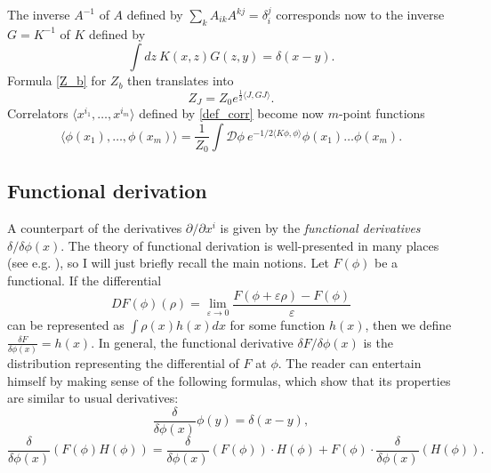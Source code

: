\documentclass[10pt]{amsart}
\theoremstyle{definition}
\theoremstyle{remark}
\newcommand{\dd}{\partial}
\def\<{\langle}
\def\>{\rangle}
\newcommand{\cD}{\mathcal{D}}
\newcommand{\Gd}{\delta}
\newcommand{\Ge}{\varepsilon}
\begin{document}
The inverse $A^{-1}$ of $A$ defined by
   $\sum_k A_{ik}A^{kj}= \Gd_i^j$
corresponds now to the inverse $G=K^{-1}$ of $K$ defined by
$$
        \int dz\ K(x,z)G(z,y)=\Gd(x-y).
$$
Formula \eqref{Z_b} for $Z_b$ then translates into
$$
         Z_J=Z_0 e^{\frac12\<J,G J\>}.
$$
Correlators $\<x^{i_1},\dots,x^{i_m}\>$ defined by
\eqref{def_corr} become now $m$-point functions
$$
     \<\phi(x_1),\dots,\phi(x_m)\>=\frac1{Z_0}\int \cD\phi\
     e^{-1/2\<K\phi,\phi\>}\phi(x_1)\dots\phi(x_m).
$$

\subsection{Functional derivation}
A counterpart of the derivatives $\dd/ \dd x^i$ is given by
the {\em functional derivatives} $\Gd / \Gd \phi(x) $.
The theory of functional derivation is well-presented in many places
(see e.g. \cite{DFN}), so I will just briefly recall the main notions.
Let $F(\phi)$ be a functional. If the differential
$$
     DF(\phi) (\rho) = \lim_{\Ge\to 0}\frac{F(\phi+\Ge\rho)-F(\phi)}{\Ge}
$$
can be represented as
$\int \rho(x) h(x) dx$ for some function $h(x)$, then we
define $\frac{\Gd F}{\Gd\phi(x)}=h(x)$.
In general, the functional derivative $\Gd F/ \Gd\phi(x)$ is the
distribution representing the differential of $F$ at
$\phi$.
The reader can entertain himself by making sense of the following
formulas, which show that its properties are similar to usual
derivatives:
$$
         \frac{\Gd}{\Gd\phi(x)}\phi(y)=\Gd(x-y),
$$
$$
   \frac{\Gd}{\Gd\phi(x)}(F(\phi)H(\phi))=\frac{\Gd}{\Gd\phi(x)}(F(\phi))
   \cdot H(\phi)+F(\phi)\cdot\frac{\Gd}{\Gd\phi(x)}(H(\phi)).
$$
\end{document}
